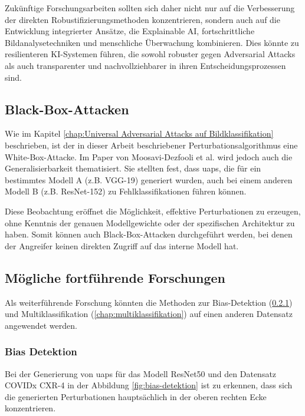 Zukünftige Forschungsarbeiten sollten sich daher nicht nur auf die Verbesserung der direkten Robustifizierungsmethoden konzentrieren, sondern auch auf die Entwicklung integrierter Ansätze, die Explainable AI, fortschrittliche Bildanalysetechniken und menschliche Überwachung kombinieren. Dies könnte zu resilienteren KI-Systemen führen, die sowohl robuster gegen Adversarial Attacks als auch transparenter und nachvollziehbarer in ihren Entscheidungsprozessen sind.

\subsection{Black-Box-Attacken}
Wie im Kapitel \ref{chap:Universal Adversarial Attacks auf Bildklassifikation} beschrieben, ist der in dieser Arbeit beschriebener Perturbationsalgorithmus eine White-Box-Attacke. Im Paper von Moosavi-Dezfooli et al.
\cite{moosavi-dezfooli_universal_2017} wird jedoch auch die Generalisierbarkeit thematisiert. Sie stellten fest, dass \acrshort{uap}s, die für ein bestimmtes Modell A (z.B. VGG-19) generiert wurden, auch bei einem anderen Modell B (z.B. ResNet-152) zu Fehlklassifikationen führen können.

Diese Beobachtung eröffnet die Möglichkeit, effektive Perturbationen zu erzeugen, ohne Kenntnis der genauen Modellgewichte oder der spezifischen Architektur zu haben. Somit können auch Black-Box-Attacken durchgeführt werden, bei denen der Angreifer keinen direkten Zugriff auf das interne Modell hat. 

\subsection{Mögliche fortführende Forschungen}
Als weiterführende Forschung könnten die Methoden zur Bias-Detektion (\ref{chap:bias-detektion}) und Multiklassifikation (\ref{chap:multiklassifikation}) auf einen anderen Datensatz angewendet werden.

\subsubsection{Bias Detektion} \label{chap:bias-detektion}
Bei der Generierung von \acrlong{uap}s für das Modell ResNet50 und den Datensatz COVIDx CXR-4 in der Abbildung \ref{fig:bias-detektion} ist zu erkennen, dass sich die generierten Perturbationen hauptsächlich in der oberen rechten Ecke konzentrieren.

